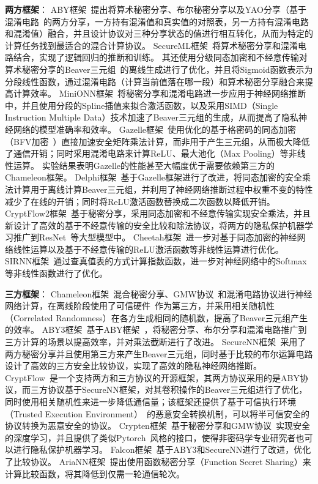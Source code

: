 \textbf{两方框架}：
ABY框架~\cite{demmler2015aby}提出将算术秘密分享、布尔秘密分享以及YAO分享（基于混淆电路~\cite{yao1986gc}的两方分享，一方持有混淆值和真实值的对照表，另一方持有混淆电路和混淆值）融合，并且设计协议对三种分享状态的值进行相互转化，从而为特定的计算任务找到最适合的混合计算协议。
%
SecureML框架~\cite{mohassel2017secureml}将算术秘密分享和混淆电路结合，实现了逻辑回归的推断和训练。
%
其还使用分级同态加密和不经意传输对算术秘密分享的Beaver三元组~\cite{beaver1992efficient}的离线生成进行了优化，并且将Sigmoid函数表示为分段线性函数，通过混淆电路（计算当前值落在哪一段）和算术秘密分享融合来提高计算效率。
%
MiniONN框架~\cite{liujian2017minionn}将秘密分享和混淆电路进一步应用于神经网络推断中，并且使用分段的Spline插值来拟合激活函数，以及采用SIMD（Single Instruction Multiple Data）技术加速了Beaver三元组的生成，从而提高了隐私神经网络的模型准确率和效率。
%
Gazelle框架~\cite{juvekar2018gazelle}使用优化的基于格密码的同态加密（BFV加密~\cite{2012bfv1,2012bfv2}）直接加速安全矩阵乘法计算，而非用于产生三元组，从而极大降低了通信开销；同时采用混淆电路来计算ReLU、最大池化（Max Pooling）等非线性运算。
实验结果表明Gazelle的性能甚至大幅度优于需要依赖第三方的Chameleon框架。
%
Delphi框架~\cite{mishra2020delphi}基于Gazelle框架进行了改进，将同态加密的安全乘法计算用于离线计算Beaver三元组，并利用了神经网络推断过程中权重不变的特性减少了在线的开销；同时将ReLU激活函数替换成二次函数以降低开销。
%
CryptFlow2框架~\cite{rathee2020cryptflow2}基于秘密分享，采用同态加密和不经意传输实现安全乘法，并且新设计了高效的基于不经意传输的安全比较和除法协议，将两方的隐私保护机器学习推广到ResNet~\cite{hekaiming2016resnet}等大型模型中。
%
Cheetah框架~\cite{huang2022cheetah}进一步对基于同态加密的神经网络线性运算以及基于不经意传输的ReLU激活函数等非线性运算进行优化。
SIRNN框架~\cite{rathee2021sirnn}通过查真值表的方式计算指数函数，进一步对神经网络中的Softmax等非线性函数进行了优化。

\textbf{三方框架}：
Chameleon框架~\cite{riazi_2018_chameleon}混合秘密分享、GMW协议~\cite{gmw_1987}和混淆电路协议进行神经网络计算，在离线阶段使用了可信硬件~\cite{sabt_2015_tee}作为第三方，并采用相关随机性（Correlated Randomness）在各方生成相同的随机数，提高了Beaver三元组产生的效率。
%
ABY3框架~\cite{mohassel2018aby3}基于ABY框架~\cite{demmler2015aby}，将秘密分享、布尔分享和混淆电路推广到三方计算的场景以提高效率，并对乘法截断进行了改进。
%
SecureNN框架~\cite{wagh2019securenn}采用了两方秘密分享并且使用第三方来产生Beaver三元组，同时基于比较的布尔运算电路设计了高效的三方安全比较协议，实现了高效的隐私神经网络推断。
%
CryptFlow~\cite{kumar2020cryptflow}是一个支持两方和三方协议的开源框架，其两方协议采用的是ABY协议，而三方协议基于SecureNN框架，对其卷积操作的Beaver三元组进行了优化，同时使用相关随机性来进一步降低通信量；该框架还提供了基于可信执行环境（Trusted Execution Environment）~\cite{sabt_2015_tee}的恶意安全转换机制，可以将半可信安全的协议转换为恶意安全的协议。
%
Crypten框架~\cite{knott2021crypten}基于秘密分享和GMW协议~\cite{gmw_1987}实现安全的深度学习，并且提供了类似Pytorch~\cite{2019_pytorch}风格的接口，使得非密码学专业研究者也可以进行隐私保护机器学习。
%
Falcon框架~\cite{wagh2021falcon}基于ABY3和SecureNN进行了改进，优化了比较协议。
%
AriaNN框架~\cite{ryffel2021ariann}提出使用函数秘密分享（Function Secret Sharing）来计算比较函数，将其降低到仅需一轮通信轮次。

